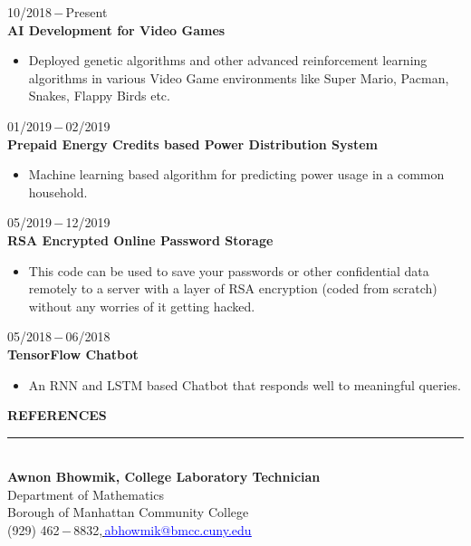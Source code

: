 \documentclass[a4paper, 12pt]{article}
\begin{document}
\begin{flushleft}
        10/2018\,$-$\,Present\\
        \textbf{AI Development for Video Games}\\\begin{itemize}
            \item Deployed genetic algorithms and other advanced reinforcement learning algorithms
            in various Video Game environments like Super Mario, Pacman, Snakes, Flappy Birds etc.
        \end{itemize}
        
        
        01/2019\,$-$\,02/2019\\
        \textbf{Prepaid Energy Credits based Power Distribution System}\\\begin{itemize}
            \item Machine learning based algorithm for predicting power usage in a common household.
        \end{itemize}
        
        05/2019\,$-$\,12/2019\\
        \textbf{RSA Encrypted Online Password Storage}\begin{itemize}
            \item This code can be used to save your passwords or other confidential data remotely to a server with a layer of RSA encryption (coded from scratch) without any worries of it getting hacked.
        \end{itemize}
        
        05/2018\,$-$\,06/2018\\
        \textbf{TensorFlow Chatbot}\begin{itemize}
            \item An RNN and LSTM based Chatbot that responds well to meaningful queries.
        \end{itemize}
    \end{flushleft}
    
    \begin{flushleft}
        \textbf{REFERENCES}\\\noindent\rule{\textwidth}{1pt}\\\textbf{Awnon Bhowmik, College Laboratory Technician}\\Department of Mathematics\\Borough of Manhattan Community College\\(929) 462\,$-$\,8832,\href{mailto: abhowmik@bmcc.cuny.edu}{\textcolor{blue}{\,\underline{abhowmik@bmcc.cuny.edu}}}
    \end{flushleft}
\end{document}
